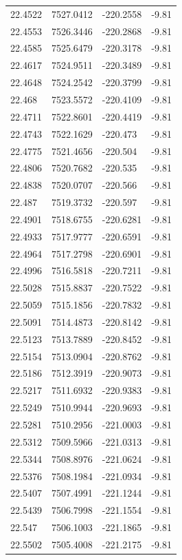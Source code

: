 \begin{table}[H]
\begin{tabular}{llll}
22.4522 & 7527.0412 & -220.2558 & -9.81 \\
22.4553 & 7526.3446 & -220.2868 & -9.81 \\
22.4585 & 7525.6479 & -220.3178 & -9.81 \\
22.4617 & 7524.9511 & -220.3489 & -9.81 \\
22.4648 & 7524.2542 & -220.3799 & -9.81 \\
22.468 & 7523.5572 & -220.4109 & -9.81 \\
22.4711 & 7522.8601 & -220.4419 & -9.81 \\
22.4743 & 7522.1629 & -220.473 & -9.81 \\
22.4775 & 7521.4656 & -220.504 & -9.81 \\
22.4806 & 7520.7682 & -220.535 & -9.81 \\
22.4838 & 7520.0707 & -220.566 & -9.81 \\
22.487 & 7519.3732 & -220.597 & -9.81 \\
22.4901 & 7518.6755 & -220.6281 & -9.81 \\
22.4933 & 7517.9777 & -220.6591 & -9.81 \\
22.4964 & 7517.2798 & -220.6901 & -9.81 \\
22.4996 & 7516.5818 & -220.7211 & -9.81 \\
22.5028 & 7515.8837 & -220.7522 & -9.81 \\
22.5059 & 7515.1856 & -220.7832 & -9.81 \\
22.5091 & 7514.4873 & -220.8142 & -9.81 \\
22.5123 & 7513.7889 & -220.8452 & -9.81 \\
22.5154 & 7513.0904 & -220.8762 & -9.81 \\
22.5186 & 7512.3919 & -220.9073 & -9.81 \\
22.5217 & 7511.6932 & -220.9383 & -9.81 \\
22.5249 & 7510.9944 & -220.9693 & -9.81 \\
22.5281 & 7510.2956 & -221.0003 & -9.81 \\
22.5312 & 7509.5966 & -221.0313 & -9.81 \\
22.5344 & 7508.8976 & -221.0624 & -9.81 \\
22.5376 & 7508.1984 & -221.0934 & -9.81 \\
22.5407 & 7507.4991 & -221.1244 & -9.81 \\
22.5439 & 7506.7998 & -221.1554 & -9.81 \\
22.547 & 7506.1003 & -221.1865 & -9.81 \\
22.5502 & 7505.4008 & -221.2175 & -9.81 \\

\end{tabular}
\end{table}
